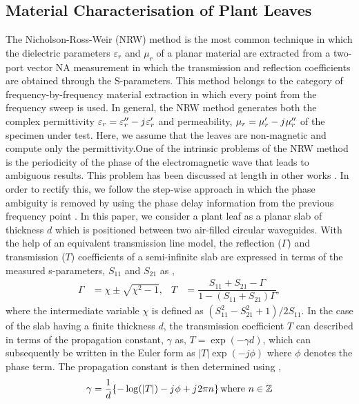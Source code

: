 \documentclass[preprints,article,accept,moreauthors,pdftex]{Definitions/mdpi}
\renewcommand{\^}{\hat}  %
\renewcommand{\j}{{j}\mkern1mu} %
\begin{document}
\subsection{Material Characterisation of Plant Leaves}
%
%
The Nicholson-Ross-Weir (NRW) method \cite{nrw} is the most common technique in which the dielectric parameters $\varepsilon_r$ and $\mu_r$ of a planar material are extracted from a two-port vector NA measurement in which the transmission and reflection coefficients are obtained through the S-parameters. This method belongs to the category of frequency-by-frequency material extraction in which every point from the frequency sweep is used. In general, the NRW method generates both the complex permittivity $\varepsilon_r = \varepsilon_r'' - \j \varepsilon_r'$ and permeability, $\mu_r = \mu_r' - \j \mu_r''$ of the specimen under test. Here, we assume that the leaves are non-magnetic and compute only the permittivity.One of the intrinsic problems of the NRW method is the periodicity of the phase of the electromagnetic wave that leads to ambiguous results. This problem has been discussed at length in other works \cite{Weir1974,Baker1990,costa_electromagnetic_2017}. In order to rectify this, we follow the step-wise approach in which the phase ambiguity is removed by using the phase delay information from the previous frequency point \cite{Luukkonen2011}. In this paper, we consider a plant leaf as a planar slab of thickness $d$ which is positioned between two air-filled circular waveguides. With the help of an equivalent transmission line model, the reflection ($\Gamma$) and transmission ($T$) coefficients of a semi-infinite slab are expressed in terms of the measured s-parameters, $S_{11}$ and $S_{21}$ as \cite{boughriet_noniterative_1997},
%
\begin{align}
	\Gamma & = \chi \pm \sqrt{\chi^2 - 1}, & T & = \dfrac{S_{11} + S_{21} - \Gamma}{1 - \left( S_{11} + S_{21}\right) \Gamma}, 
	\label{eq:ref_tran_coefficients}
\end{align}
% 
where the intermediate variable $\chi$ is defined as $\left(S_{11}^2 - S_{21}^2 + 1\right)/{2 S_{11}}$. In the case of the slab having a finite thickness $d$, the transmission coefficient $T$ can described in terms of the propagation constant, $\gamma$ as, $T = \exp( - \gamma d)$,  which can subsequently be written in the Euler form as $|T| \exp(-j \phi)$ where $\phi$ denotes the phase term. The propagation constant is then determined using \cite{costa_electromagnetic_2017},
%
\begin{equation}
	\gamma = \frac{1}{d} \{ - \log(|T|) - \j \phi + \j 2 \pi n \} \, \mathrm{where}~ n \in \mathbb{Z}
	\label{eq:roots}
\end{equation}
\end{document}
